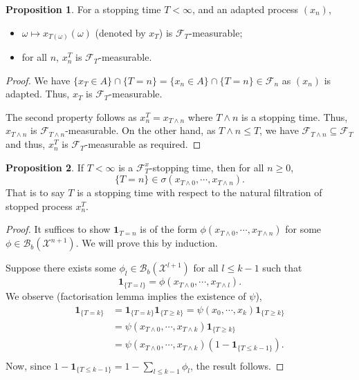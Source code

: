 \documentclass[]{article}
\theoremstyle{definition}
\theoremstyle{definition}
\newtheorem{proposition}{Proposition}[section]
\begin{document}
\begin{proposition}
  For a stopping time \(T < \infty\), and an adapted process \((x_n)\), 
  \begin{itemize}
    \item \(\omega \mapsto x_{T(\omega)}(\omega)\) (denoted by \(x_T\)) is \(\mathcal{F}_T\)-measurable; 
    \item for all \(n\), \(x_n^T\) is \(\mathcal{F}_T\)-measurable. 
  \end{itemize}
\end{proposition}
\begin{proof}
  We have \(\{x_T \in A\} \cap \{T = n\} = \{x_n \in A\} \cap \{T = n\} \in \mathcal{F}_n\) 
  as \((x_n)\) is adapted. Thus, \(x_T\) is \(\mathcal{F}_T\)-measurable.

  The second property follows as \(x^T_n = x_{T \wedge n}\) where \(T \wedge n\) 
  is a stopping time. Thus, \(x_{T \wedge n}\) is \(\mathcal{F}_{T \wedge n}\)-measurable. 
  On the other hand, as \(T \wedge n \le T\), we have \(\mathcal{F}_{T \wedge n} \subseteq \mathcal{F}_T\)
  and thus, \(x^T_n\) is \(\mathcal{F}_T\)-measurable as required.
\end{proof}

\begin{proposition}
  If \(T < \infty\) is a \(\mathcal{F}_T^x\)-stopping time, then for all \(n \ge 0\), 
  \[\{T = n\} \in \sigma(x_{T \wedge 0}, \cdots, x_{T \wedge n}).\]
  That is to say \(T\) is a stopping time with respect to the natural filtration of 
  stopped process \(x_n^T\).
\end{proposition}
\begin{proof}
  It suffices to show \(\mathbf{1}_{T = n}\) is of the form \(\phi(x_{T \wedge 0}, \cdots, x_{T \wedge n})\)
  for some \(\phi \in \mathcal{B}_b(\mathcal{X}^{n + 1})\). We will prove this by induction.

  Suppose there exists some \(\phi_l \in \mathcal{B}_b(\mathcal{X}^{l + 1})\) for all 
  \(l \le k - 1\) such that 
  \[\mathbf{1}_{\{T = l\}} = \phi(x_{T \wedge 0}, \cdots, x_{T \wedge l}).\]
  We observe (factorisation lemma implies the existence of \(\psi\)),
  \[\begin{split}
    \mathbf{1}_{\{T = k\}} & = \mathbf{1}_{\{T = k\}}\mathbf{1}_{\{T \ge k\}} = \psi(x_0, \cdots, x_k) \mathbf{1}_{\{T \ge k\}}\\
    & = \psi(x_{T \wedge 0}, \cdots, x_{T \wedge k}) \mathbf{1}_{\{T \ge k\}} \\ 
    & = \psi(x_{T \wedge 0}, \cdots, x_{T \wedge k}) (1 - \mathbf{1}_{\{T \le k - 1\}}).\\
  \end{split}\]
  Now, since \(1 - \mathbf{1}_{\{T \le k - 1\}} = 1 - \sum_{l \le k - 1} \phi_l\), the result follows.
\end{proof}
\end{document}

